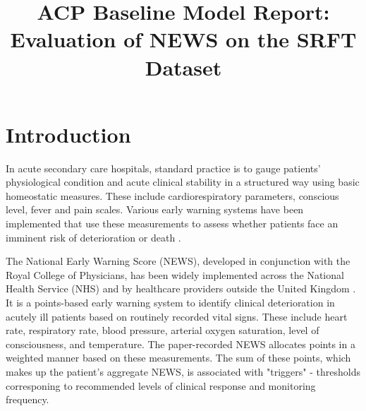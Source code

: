 \documentclass[10pt,journal, compsoc]{IEEEtran}
\begin{document}
\title{ACP Baseline Model Report:\\
{Evaluation of NEWS on the SRFT Dataset}
}
\author{}

\maketitle


\section{Introduction}
In acute secondary care hospitals, standard practice is to gauge patients' physiological condition and acute clinical stability in a structured way using basic homeostatic measures. These include cardiorespiratory parameters, conscious level, fever and pain scales. Various early warning systems have been implemented that use these measurements to assess whether patients face an imminent risk of deterioration or death \cite{Smith13}.

The National Early Warning Score (NEWS), developed in conjunction with the Royal College of Physicians, has been widely implemented across the National Health Service (NHS) and by healthcare providers outside the United Kingdom \cite[pp.~13]{RCP17}. It is a points-based early warning system to identify clinical deterioration in acutely ill patients based on routinely recorded vital signs. These include heart rate, respiratory rate, blood pressure, arterial oxygen saturation, level of consciousness, and temperature. The paper-recorded NEWS allocates points in a weighted manner based on these measurements. The sum of these points, which makes up the patient's aggregate NEWS, is associated with "triggers" - thresholds corresponing to recommended levels of clinical response and monitoring frequency.
\end{document}
